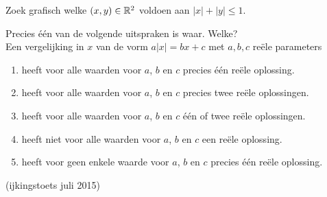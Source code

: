 \documentclass{ximera}
\begin{document}
\begin{exercise}
	 \label{oef9} Zoek grafisch welke $(x,y)\in \mathbb{R}^2$ voldoen aan
$|x|+|y| \leqslant 1.$
\end{exercise}
\begin{exercise}
	
Precies \'e\'en van de volgende uitspraken is waar. Welke?\\
Een vergelijking in $x$ van de vorm $a |x| = bx + c$ met $a,b,c$ re\"ele parameters
\begin{enumerate}%
	\item heeft voor alle waarden voor $a$, $b$ en $c$ precies \'e\'en re\"ele oplossing.
	\item heeft voor alle waarden voor $a$, $b$ en $c$ precies twee re\"ele oplossingen.
	\item heeft voor alle waarden voor $a$, $b$ en $c$ \'e\'en of twee re\"ele oplossingen.
	\item heeft niet voor alle waarden voor $a$, $b$ en $c$ een re\"ele oplossing.
	\item heeft voor geen enkele waarde voor $a$, $b$ en $c$ precies \'e\'en re\"ele oplossing.
\end{enumerate}
(ijkingstoets juli 2015)
\end{exercise}

%
%
\end{document}
